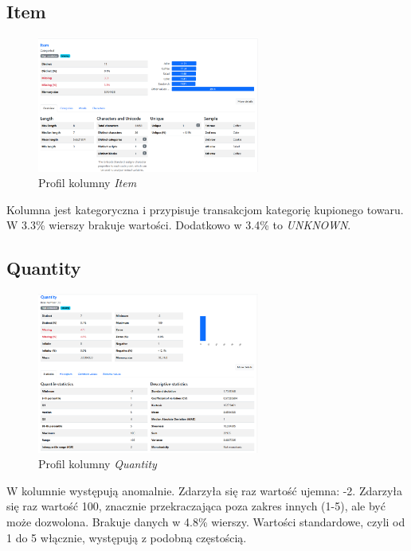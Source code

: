 \documentclass[a4paper,12pt]{article}
\begin{document}
\subsection{Item}

\begin{figure}[H]
  \centering
  \includegraphics[width=0.65\textwidth]{images/py_2.png}
  \caption{Profil kolumny \textit{Item}}
\end{figure}

Kolumna jest kategoryczna i przypisuje transakcjom kategorię kupionego towaru. W 3.3\% wierszy brakuje wartości. Dodatkowo w 3.4\% to \textit{UNKNOWN}. 

\subsection{Quantity}

\begin{figure}[H]
  \centering
  \includegraphics[width=0.65\textwidth]{images/py_3.png}
  \caption{Profil kolumny \textit{Quantity}}
\end{figure}

W kolumnie występują anomalnie. Zdarzyła się raz wartość ujemna: -2. Zdarzyła się raz wartość 100, znacznie przekraczająca poza zakres innych (1-5), ale być może dozwolona. Brakuje danych w 4.8\% wierszy. Wartości standardowe, czyli od 1 do 5 włącznie, występują z podobną częstością.
\end{document}
